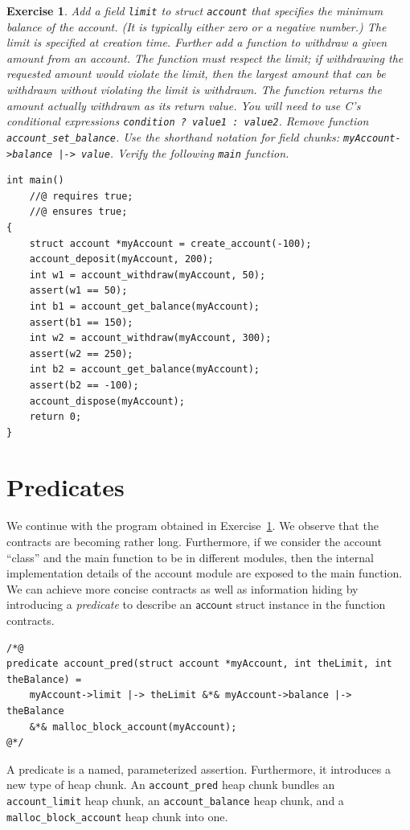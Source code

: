 \documentclass{article}
\newtheorem{exercise}{Exercise}
\begin{document}
\begin{exercise}\label{exercise:limit}
Add a field \lstinline!limit! to struct \lstinline!account! that specifies the minimum balance of the account. (It is typically either zero or a negative number.)
The limit is specified at creation time. Further add a function
to withdraw a given amount from an account. The function must
respect the limit; if withdrawing the requested amount would violate the limit, then the largest amount that can be withdrawn without violating the limit is withdrawn. The function
returns the amount actually withdrawn as its return value. You
will need to use C's conditional expressions
\lstinline!condition ? value1 : value2!. Remove function
\lstinline!account_set_balance!. Use the shorthand notation for
field chunks: \lstinline!myAccount->balance |-> value!. Verify
the following \lstinline!main! function.
\begin{lstlisting}[basicstyle=\ttfamily\upshape]
int main()
    //@ requires true;
    //@ ensures true;
{
    struct account *myAccount = create_account(-100);
    account_deposit(myAccount, 200);
    int w1 = account_withdraw(myAccount, 50);
    assert(w1 == 50);
    int b1 = account_get_balance(myAccount);
    assert(b1 == 150);
    int w2 = account_withdraw(myAccount, 300);
    assert(w2 == 250);
    int b2 = account_get_balance(myAccount);
    assert(b2 == -100);
    account_dispose(myAccount);
    return 0;
}
\end{lstlisting}
\end{exercise}

\section{Predicates}

We continue with the program obtained in
Exercise~\ref{exercise:limit}. We observe that the contracts
are becoming rather long. Furthermore, if we consider the
account ``class'' and the main function to be in different
modules, then the internal implementation details of the
account module are exposed to the main function. We can achieve
more concise contracts as well as information hiding by
introducing a \emph{predicate} to describe an
$\mathsf{account}$ struct instance in the function contracts.
\begin{lstlisting}
/*@
predicate account_pred(struct account *myAccount, int theLimit, int theBalance) =
    myAccount->limit |-> theLimit &*& myAccount->balance |-> theBalance
    &*& malloc_block_account(myAccount);
@*/
\end{lstlisting}
A predicate is a named, parameterized assertion. Furthermore, it introduces a new type of heap chunk.
An \lstinline!account_pred! heap chunk bundles an \lstinline!account_limit! heap chunk, an \lstinline!account_balance! heap chunk,
and a \lstinline!malloc_block_account! heap chunk into one.
\end{document}
